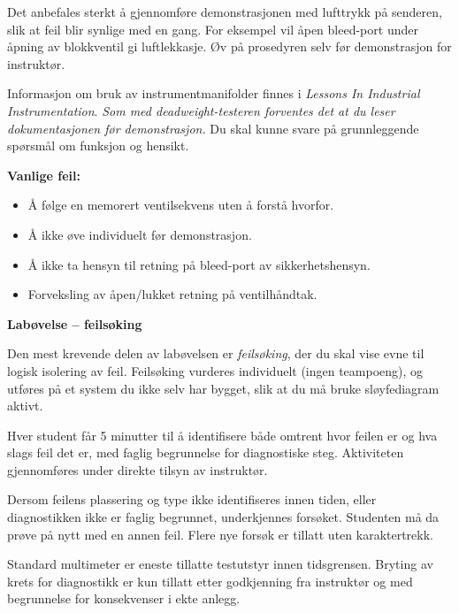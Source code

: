 Det anbefales sterkt å gjennomføre demonstrasjonen med lufttrykk på senderen, slik at feil blir synlige med en gang. For eksempel vil åpen bleed-port under åpning av blokkventil gi luftlekkasje. Øv på prosedyren selv før demonstrasjon for instruktør.

Informasjon om bruk av instrumentmanifolder finnes i {\it Lessons In Industrial Instrumentation}. {\it Som med deadweight-testeren forventes det at du leser dokumentasjonen før demonstrasjon.} Du skal kunne svare på grunnleggende spørsmål om funksjon og hensikt.

\vskip 10pt

{\bf Vanlige feil:}

\begin{itemize}
\item{} Å følge en memorert ventilsekvens uten å forstå hvorfor.
\item{} Å ikke øve individuelt før demonstrasjon.
\item{} Å ikke ta hensyn til retning på bleed-port av sikkerhetshensyn.
\item{} Forveksling av åpen/lukket retning på ventilhåndtak.
\end{itemize}









\vfil \eject

\noindent
{\bf Labøvelse -- feilsøking}

\vskip 5pt

Den mest krevende delen av labøvelsen er {\it feilsøking}, der du skal vise evne til logisk isolering av feil. Feilsøking vurderes individuelt (ingen teampoeng), og utføres på et system du ikke selv har bygget, slik at du må bruke sløyfediagram aktivt.

Hver student får 5 minutter til å identifisere både omtrent hvor feilen er og hva slags feil det er, med faglig begrunnelse for diagnostiske steg. Aktiviteten gjennomføres under direkte tilsyn av instruktør.

Dersom feilens plassering og type ikke identifiseres innen tiden, eller diagnostikken ikke er faglig begrunnet, underkjennes forsøket. Studenten må da prøve på nytt med en annen feil. Flere nye forsøk er tillatt uten karaktertrekk.

Standard multimeter er eneste tillatte testutstyr innen tidsgrensen. Bryting av krets for diagnostikk er kun tillatt etter godkjenning fra instruktør og med begrunnelse for konsekvenser i ekte anlegg.

